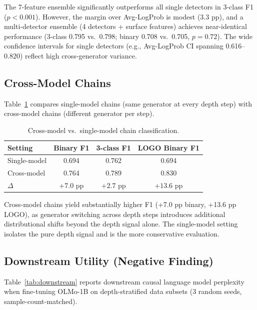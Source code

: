 \documentclass[11pt,a4paper]{article}
\begin{document}
The 7-feature ensemble significantly outperforms all single detectors in 3-class F1 ($p < 0.001$). However, the margin over Avg-LogProb is modest (3.3 pp), and a multi-detector ensemble (4 detectors + surface features) achieves near-identical performance (3-class 0.795 vs.\ 0.798; binary 0.708 vs.\ 0.705, $p = 0.72$). The wide confidence intervals for single detectors (e.g., Avg-LogProb CI spanning 0.616--0.820) reflect high cross-generator variance.

\subsection{Cross-Model Chains}

Table~\ref{tab:cross_model} compares single-model chains (same generator at every depth step) with cross-model chains (different generator per step).

\begin{table}[t]
\centering
\small
\caption{Cross-model vs.\ single-model chain classification.}
\label{tab:cross_model}
\begin{tabular}{lccc}
\toprule
Setting & Binary F1 & 3-class F1 & LOGO Binary F1 \\
\midrule
Single-model & 0.694 & 0.762 & 0.694 \\
Cross-model & 0.764 & 0.789 & 0.830 \\
\midrule
$\Delta$ & $+7.0$ pp & $+2.7$ pp & $+13.6$ pp \\
\bottomrule
\end{tabular}
\end{table}

Cross-model chains yield substantially higher F1 (+7.0 pp binary, +13.6 pp LOGO), as generator switching across depth steps introduces additional distributional shifts beyond the depth signal alone. The single-model setting isolates the pure depth signal and is the more conservative evaluation.

\subsection{Downstream Utility (Negative Finding)}

Table~\ref{tab:downstream} reports downstream causal language model perplexity when fine-tuning OLMo-1B on depth-stratified data subsets (3 random seeds, sample-count-matched).
\end{document}
